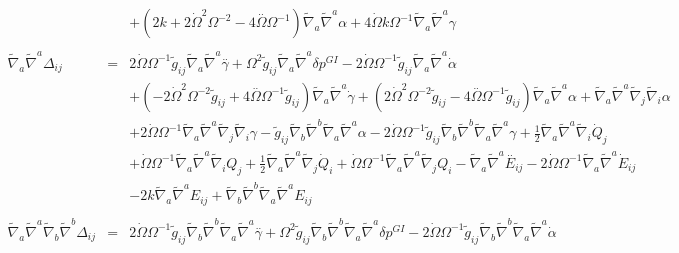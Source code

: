 \documentclass[10pt,letterpaper]{article}
\numberwithin{equation}{section}
\begin{document}
\begin{appendices}
\begin{eqnarray}
&& + (2 k + 2 \dot{\Omega}^2 \Omega^{-2} - 4 \overset{..}{\Omega} \Omega^{-1}) \tilde{\nabla}_{a}\tilde{\nabla}^{a}\alpha + 4 \dot{\Omega} k \Omega^{-1} \tilde{\nabla}_{a}\tilde{\nabla}^{a}\gamma 
\\  \nonumber\\ 
\tilde\nabla_a\tilde\nabla^a \Delta_{ij}&=& 2 \dot{\Omega} \Omega^{-1} \tilde{g}_{ij} \tilde{\nabla}_{a}\tilde{\nabla}^{a}\overset{..}{\gamma} + \Omega^2 \tilde{g}_{ij} \tilde{\nabla}_{a}\tilde{\nabla}^{a}\delta p^{GI}{} - 2 \dot{\Omega} \Omega^{-1} \tilde{g}_{ij} \tilde{\nabla}_{a}\tilde{\nabla}^{a}\dot{\alpha} \nonumber \\ 
&& + (-2 \dot{\Omega}^2 \Omega^{-2} \tilde{g}_{ij} + 4 \overset{..}{\Omega} \Omega^{-1} \tilde{g}_{ij}) \tilde{\nabla}_{a}\tilde{\nabla}^{a}\dot{\gamma} + (2 \dot{\Omega}^2 \Omega^{-2} \tilde{g}_{ij} - 4 \overset{..}{\Omega} \Omega^{-1} \tilde{g}_{ij}) \tilde{\nabla}_{a}\tilde{\nabla}^{a}\alpha + \tilde{\nabla}_{a}\tilde{\nabla}^{a}\tilde{\nabla}_{j}\tilde{\nabla}_{i}\alpha \nonumber \\ 
&& + 2 \dot{\Omega} \Omega^{-1} \tilde{\nabla}_{a}\tilde{\nabla}^{a}\tilde{\nabla}_{j}\tilde{\nabla}_{i}\gamma -  \tilde{g}_{ij} \tilde{\nabla}_{b}\tilde{\nabla}^{b}\tilde{\nabla}_{a}\tilde{\nabla}^{a}\alpha - 2 \dot{\Omega} \Omega^{-1} \tilde{g}_{ij} \tilde{\nabla}_{b}\tilde{\nabla}^{b}\tilde{\nabla}_{a}\tilde{\nabla}^{a}\gamma +\tfrac{1}{2} \tilde{\nabla}_{a}\tilde{\nabla}^{a}\tilde{\nabla}_{i}\dot{Q}_{j} \nonumber \\ 
&& + \dot{\Omega} \Omega^{-1} \tilde{\nabla}_{a}\tilde{\nabla}^{a}\tilde{\nabla}_{i}Q_{j} + \tfrac{1}{2} \tilde{\nabla}_{a}\tilde{\nabla}^{a}\tilde{\nabla}_{j}\dot{Q}_{i} + \dot{\Omega} \Omega^{-1} \tilde{\nabla}_{a}\tilde{\nabla}^{a}\tilde{\nabla}_{j}Q_{i}- \tilde{\nabla}_{a}\tilde{\nabla}^{a}\overset{..}{E}_{ij} - 2 \dot{\Omega} \Omega^{-1} \tilde{\nabla}_{a}\tilde{\nabla}^{a}\dot{E}_{ij} \nonumber \\ 
&& - 2 k \tilde{\nabla}_{a}\tilde{\nabla}^{a}E_{ij} + \tilde{\nabla}_{b}\tilde{\nabla}^{b}\tilde{\nabla}_{a}\tilde{\nabla}^{a}E_{ij}
\\  \nonumber\\ 
\tilde\nabla_a\tilde\nabla^a \tilde\nabla_b\tilde\nabla^b \Delta_{ij}&=& 2 \dot{\Omega} \Omega^{-1} \tilde{g}_{ij} \tilde{\nabla}_{b}\tilde{\nabla}^{b}\tilde{\nabla}_{a}\tilde{\nabla}^{a}\overset{..}{\gamma} + \Omega^2 \tilde{g}_{ij} \tilde{\nabla}_{b}\tilde{\nabla}^{b}\tilde{\nabla}_{a}\tilde{\nabla}^{a}\delta p^{GI}{} - 2 \dot{\Omega} \Omega^{-1} \tilde{g}_{ij} \tilde{\nabla}_{b}\tilde{\nabla}^{b}\tilde{\nabla}_{a}\tilde{\nabla}^{a}\dot{\alpha} \nonumber \\ 

\end{eqnarray}
\end{appendices}
\end{document}
